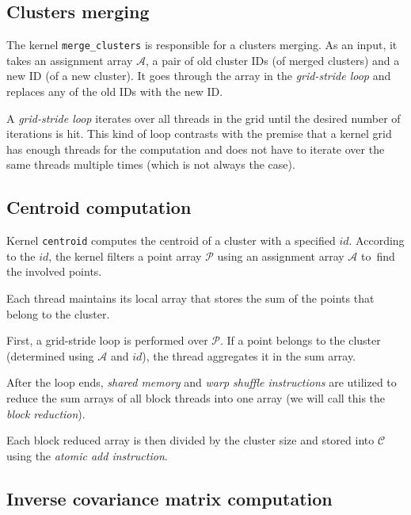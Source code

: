 \subsection{Clusters merging}


The kernel \texttt{merge\_clusters} is responsible for a clusters merging. As an input, it takes an assignment array $\mathcal{A}$, a pair of old cluster IDs (of merged clusters) and a new ID (of a new cluster). It goes through the array in the \emph{grid-stride loop} and replaces any of the old IDs with the new ID.

\begin{defn}
	A \emph{grid-stride loop} iterates over all threads in the grid until the desired number of iterations is hit. This kind of loop contrasts with the premise that a kernel grid has enough threads for the computation and does not have to iterate over the same threads multiple times (which is not always the case). 
	\label{def03:grid-stride}
\end{defn}

\subsection{Centroid computation}

Kernel \texttt{centroid} computes the centroid of a cluster with a specified $id$. According to the $id$, the kernel filters a point array $\mathcal{P}$ using an assignment array $\mathcal{A}$ to~find the involved points.

Each thread maintains its local array that stores the sum of the points that belong to the cluster. 

First, a grid-stride loop is performed over $\mathcal{P}$. If a point belongs to the cluster (determined using $\mathcal{A}$ and $id$), the thread aggregates it in the sum array. 

After the loop ends, \emph{shared memory} and \emph{warp shuffle instructions} are utilized to reduce the sum arrays of all block threads into one array (we will call this the \emph{block reduction}).

Each block reduced array is then divided by the cluster size and stored into $\mathcal{C}$ using the \emph{atomic add instruction}. 

\subsection{Inverse covariance matrix computation}



